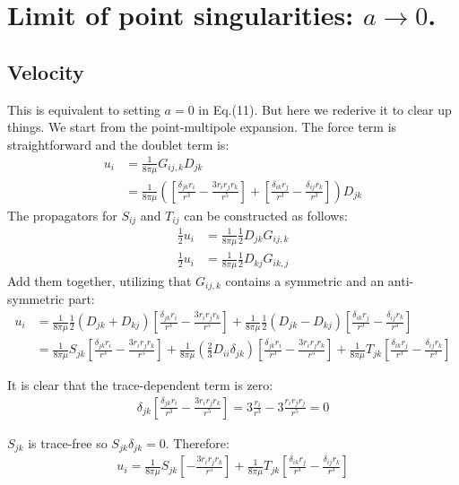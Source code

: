 \documentclass[11pt]{article}
\begin{document}
\section{Limit of point singularities: $a\to 0$.}
\subsection{Velocity}
This is equivalent to setting $a=0$ in Eq.(11). But here we rederive it to clear up things. We start from the point-multipole expansion. The force term is straightforward and the doublet term is:
\begin{align}
	u_i &= \frac{1}{8\pi\mu} G_{ij,k} D_{jk} \\
	&= \frac{1}{8\pi\mu} \left(\left[ \frac{\delta_{jk}r_i}{r^3} - \frac{3r_ir_jr_k}{r^5} \right] + \left[\frac{\delta_{ik}r_j}{r^3} -\frac{\delta_{ij}r_k}{r^3} \right]\right)D_{jk}
\end{align}
The propagators for $S_{ij}$ and $T_{ij}$ can be constructed as follows:
\begin{align}
	\frac{1}{2} u_i &= \frac{1}{8\pi\mu} \frac{1}{2} D_{jk} G_{ij,k} \\
	\frac{1}{2} u_i &= \frac{1}{8\pi\mu} \frac{1}{2} D_{kj} G_{ik,j}
\end{align}
Add them together, utilizing that $G_{ij,k}$ contains a symmetric and an anti-symmetric part:
\begin{align}
	u_i &= \frac{1}{8\pi\mu} \frac{1}{2}\left(D_{jk}+D_{kj}\right)\left[ \frac{\delta_{jk}r_i}{r^3} - \frac{3r_ir_jr_k}{r^5} \right] + \frac{1}{8\pi\mu} \frac{1}{2}\left(D_{jk}-D_{kj}\right) \left[\frac{\delta_{ik}r_j}{r^3} -\frac{\delta_{ij}r_k}{r^3} \right]\\ 
	&= \frac{1}{8\pi\mu}S_{jk}\left[ \frac{\delta_{jk}r_i}{r^3} - \frac{3r_ir_jr_k}{r^5} \right] + \frac{1}{8\pi\mu}\left( \frac{2}{3} D_{ii}\delta_{jk} \right)\left[ \frac{\delta_{jk}r_i}{r^3} - \frac{3r_ir_jr_k}{r^5} \right] + \frac{1}{8\pi\mu}T_{jk} \left[\frac{\delta_{ik}r_j}{r^3} -\frac{\delta_{ij}r_k}{r^3} \right]
\end{align}

It is clear that the trace-dependent term is zero:
\begin{align}
   \delta_{jk} \left[ \frac{\delta_{jk}r_i}{r^3} - \frac{3r_ir_jr_k}{r^5} \right] = 3\frac{r_i}{r^3} - 3\frac{r_ir_jr_j}{r^5} = 0
\end{align}

$S_{jk}$ is trace-free so $S_{jk}\delta_{jk}=0$. Therefore:
\begin{align}
	u_i = \frac{1}{8\pi\mu}S_{jk}\left[ - \frac{3r_ir_jr_k}{r^5} \right]  + \frac{1}{8\pi\mu}T_{jk} \left[\frac{\delta_{ik}r_j}{r^3} -\frac{\delta_{ij}r_k}{r^3} \right]
\end{align}
\end{document}

